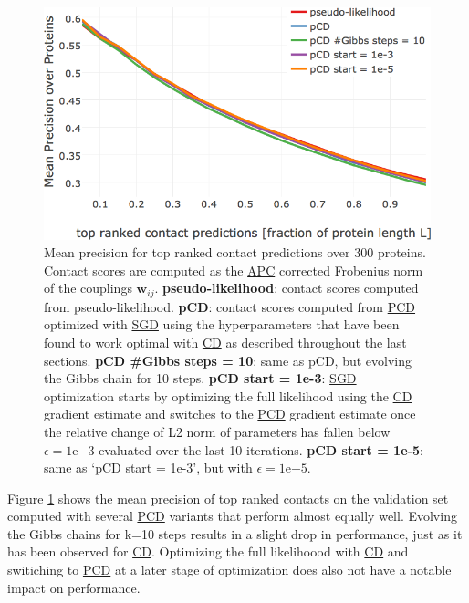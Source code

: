 \documentclass[11pt,a4paper,twoside]{book}
\newcommand{\eq}{\!=\!}
\newcommand{\wij}{\mathbf{w}_{ij}}
\theoremstyle{definition}
\theoremstyle{definition}
\theoremstyle{remark}
\begin{document}
\begin{figure}

{\centering \includegraphics[width=0.9\linewidth]{img/full_likelihood/pcd/precision_vs_rank_notitle} 

}

\caption{Mean precision for top ranked contact
predictions over 300 proteins. Contact scores are computed as the
\protect\hyperlink{abbrev}{APC} corrected Frobenius norm of the
couplings \(\wij\). \textbf{pseudo-likelihood}: contact scores computed
from pseudo-likelihood. \textbf{pCD}: contact scores computed from
\protect\hyperlink{abbrev}{PCD} optimized with
\protect\hyperlink{abbrev}{SGD} using the hyperparameters that have been
found to work optimal with \protect\hyperlink{abbrev}{CD} as described
throughout the last sections. \textbf{pCD \#Gibbs steps = 10}: same as
pCD, but evolving the Gibbs chain for 10 steps. \textbf{pCD start =
1e-3}: \protect\hyperlink{abbrev}{SGD} optimization starts by optimizing
the full likelihood using the \protect\hyperlink{abbrev}{CD} gradient
estimate and switches to the \protect\hyperlink{abbrev}{PCD} gradient
estimate once the relative change of L2 norm of parameters has fallen
below \(\epsilon \eq \mathrm{1e}{-3}\) evaluated over the last 10
iterations. \textbf{pCD start = 1e-5}: same as `pCD start = 1e-3', but
with \(\epsilon \eq \mathrm{1e}{-5}\).}\label{fig:precision-pcd}
\end{figure}

Figure \ref{fig:precision-pcd} shows the mean precision of top ranked
contacts on the validation set computed with several
\protect\hyperlink{abbrev}{PCD} variants that perform almost equally
well. Evolving the Gibbs chains for k=10 steps results in a slight drop
in performance, just as it has been observed for
\protect\hyperlink{abbrev}{CD}. Optimizing the full likelihoood with
\protect\hyperlink{abbrev}{CD} and switiching to
\protect\hyperlink{abbrev}{PCD} at a later stage of optimization does
also not have a notable impact on performance.
\end{document}
